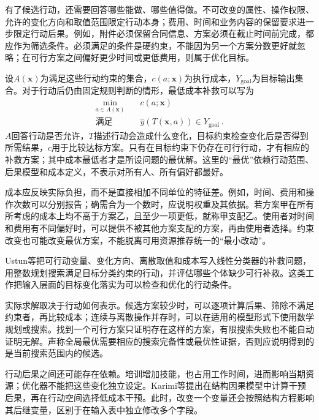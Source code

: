 有了候选行动，还需要回答哪些能做、哪些值得做。不可改变的属性、操作权限、允许的变化方向和取值范围限定行动本身；费用、时间和业务内容的保留要求进一步限定行动后果。例如，附件必须保留合同信息、方案必须在截止时间前完成，都应作为筛选条件。必须满足的条件是硬约束，不能因为另一个方案分数更好就忽略；在可行方案之间偏好更少时间或更低费用，则属于优化目标。

设$A(\bm{x})$为满足这些行动约束的集合，$c(a;\bm{x})$为执行成本，$Y_{\mathrm{goal}}$为目标输出集合。对于行动后仍由固定规则判断的情形，最低成本补救可以写为
\begin{equation}
 \begin{aligned}
 \min_{a\in A(\bm{x})}\quad &c(a;\bm{x})\\
 \text{满足}\quad &\hat y(T(\bm{x},a))\in Y_{\mathrm{goal}}\, .
 \end{aligned}
 \label{eq:interpretability-recourse}
\end{equation}
$A$回答行动是否允许，$T$描述行动会造成什么变化，目标约束检查变化后是否得到所需结果，$c$用于比较达标方案。只有在目标约束下仍存在可行行动，才有相应的补救方案；其中成本最低者才是所设问题的最优解。这里的“最优”依赖行动范围、后果模型和成本定义，不表示对所有人、所有偏好都最好。

成本应反映实际负担，而不是直接相加不同单位的特征差。例如，时间、费用和操作次数可以分别报告；确需合为一个数时，应说明权重及其依据。若方案甲在所有所考虑的成本上均不高于方案乙，且至少一项更低，就称甲支配乙。使用者对时间和费用有不同偏好时，可以提供不被其他方案支配的方案，再由使用者选择。约束改变也可能改变最优方案，不能脱离可用资源推荐统一的“最小改动”。

Ustun等把可行动变量、变化方向、离散取值和成本写入线性分类器的补救问题，用整数规划搜索满足目标分类约束的行动，并评估哪些个体缺少可行补救。这类工作把输入层面的目标变化落实为可以检查和优化的行动条件。

实际求解取决于行动如何表示。候选方案较少时，可以逐项计算后果、筛除不满足约束者，再比较成本；连续与离散操作并存时，可以在适用的模型形式下使用数学规划或搜索。找到一个可行方案只证明存在这样的方案，有限搜索失败也不能自动证明无解。声称全局最优需要相应的搜索完备性或最优性证据，否则应说明得到的是当前搜索范围内的候选。

行动后果之间还可能存在依赖。培训增加技能，也占用工作时间，进而影响当期资源；优化器不能把这些变化独立设定。Karimi等提出在结构因果模型中计算干预后果，再在行动空间选择低成本干预。此时，改变一个变量还会按照结构方程影响其后继变量，区别于在输入表中独立修改多个字段。

